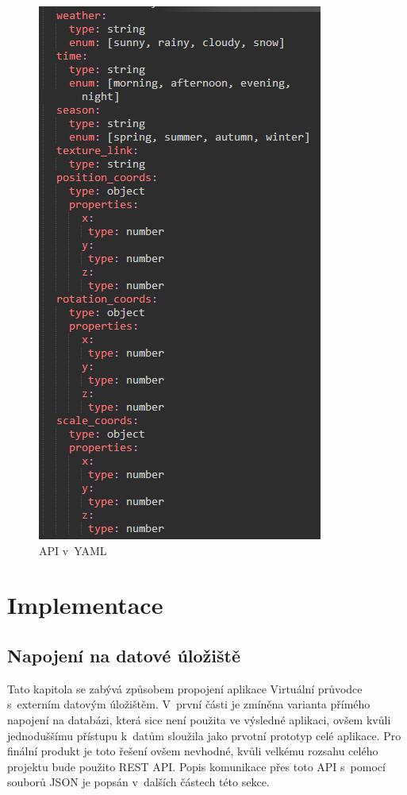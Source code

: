 \documentclass[thesis=B,czech]{FITthesis}[2012/06/26]
\begin{document}
	\begin{figure}
  		\includegraphics{api.png}
  		\caption{API v~YAML}
  		\label{fig:yamlAPI}
	\end{figure}
	
\chapter{Implementace}

	\section{Napojení na datové úložiště}
		    Tato kapitola se zabývá způsobem propojení aplikace Virtuální průvodce s~externím datovým úložištěm. V~první části je zmíněna varianta přímého napojení na databázi, která sice není použita ve výsledné aplikaci, ovšem kvůli jednoduššímu přístupu k~datům sloužila jako prvotní prototyp celé aplikace. Pro finální produkt je toto řešení ovšem nevhodné, kvůli velkému rozsahu celého projektu bude použito REST API. Popis komunikace přes toto API s~pomocí souborů JSON je popsán v~dalších částech této sekce.
    
\end{document}
